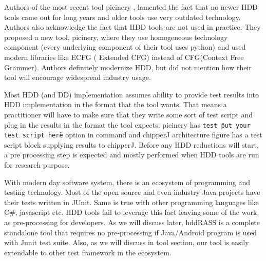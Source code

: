 Authors of the most recent tool picinery  \cite{pricieley}, lamented the fact that no newer HDD tools came out for long years and older tools use very outdated technology. Authors also acknowledge the fact that HDD tools are not used in practice. They proposed a new tool, picinery, where they use homogeneous technology component (every underlying component of their tool uses python) and used modern libraries like ECFG ( Extended CFG) instead of CFG(Context Free Grammer). Authors definitely modernize HDD, but did not mention how their tool will encourage widespread industry usage. 


Most HDD (and DD) implementation assumes ability to provide test results into HDD implementation in the format that the tool wants. That means a practitioner will have to make sure that they write some sort of test script and plug in the results in the format the tool expects. picinery has \texttt{test \"put your test script here\"} option in command and chipperJ architecture figure has a test script block supplying results to chipperJ.  Before any HDD reductions will start, a pre processing step is expected and mostly performed when HDD tools are run for research purpose. 
 
With modern day software system, there is an ecosystem of programming and testing technology. Most of the open source and even industry Java projects have their tests written in JUnit. Same is true with other programming languages like C\#, javascript etc. HDD tools fail to leverage this fact leaving some of the work as pre-processing for developers. As we will discuss later, hddRASS is a complete standalone tool that requires no pre-processing if Java/Android program is used with Junit \cite{junitHome} test suite. Also, as we will discuss in tool section, our tool is easily extendable to other test framework in the ecosystem.

 

    

   

